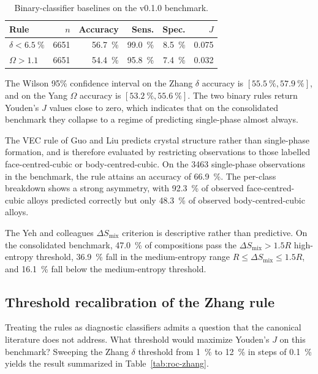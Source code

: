 \documentclass[review,times,nonatbib]{elsarticle}
\newcommand{\Smix}{\ensuremath{\Delta S_{\mathrm{mix}}}}
\newcommand{\Omegaparam}{\ensuremath{\Omega}}
\begin{document}
\begin{table}[ht]
\centering
\caption{Binary-classifier baselines on the v0.1.0 benchmark.}
\label{tab:rule-baselines}
\begin{tabular}{lrrrrr}
\toprule
Rule & $n$ & Accuracy & Sens. & Spec. & $J$ \\
\midrule
$\delta < \SI{6.5}{\percent}$ \cite{zhang2008} & \num{6651} & \SI{56.7}{\percent} & \SI{99.0}{\percent} & \SI{8.5}{\percent} & 0.075 \\
$\Omegaparam > 1.1$ \cite{yang2012}            & \num{6651} & \SI{54.4}{\percent} & \SI{95.8}{\percent} & \SI{7.4}{\percent} & 0.032 \\
\bottomrule
\end{tabular}
\end{table}

The Wilson 95\% confidence interval on the Zhang $\delta$ accuracy
is $[\SI{55.5}{\percent}, \SI{57.9}{\percent}]$, and on the Yang
$\Omegaparam$ accuracy is $[\SI{53.2}{\percent}, \SI{55.6}{\percent}]$.
The two binary rules return Youden's $J$ values close to zero,
which indicates that on the consolidated benchmark they collapse
to a regime of predicting single-phase almost always.

The VEC rule of Guo and Liu \cite{guo2011} predicts crystal
structure rather than single-phase formation, and is therefore
evaluated by restricting observations to those labelled
face-centred-cubic or body-centred-cubic. On the \num{3463}
single-phase observations in the benchmark, the rule attains an
accuracy of \SI{66.9}{\percent}. The per-class breakdown shows a
strong asymmetry, with \SI{92.3}{\percent} of observed
face-centred-cubic alloys predicted correctly but only
\SI{48.3}{\percent} of observed body-centred-cubic alloys.

The Yeh and colleagues \cite{yeh2004} $\Smix$ criterion is
descriptive rather than predictive. On the consolidated benchmark,
\SI{47.0}{\percent} of compositions pass the $\Smix > 1.5 R$
high-entropy threshold, \SI{36.9}{\percent} fall in the
medium-entropy range $R \leq \Smix \leq 1.5R$, and
\SI{16.1}{\percent} fall below the medium-entropy threshold.

\subsection{Threshold recalibration of the Zhang rule}

Treating the rules as diagnostic classifiers admits a question
that the canonical literature does not address. What threshold
would maximize Youden's $J$ on this benchmark? Sweeping the
Zhang \cite{zhang2008} $\delta$ threshold from \SI{1}{\percent} to
\SI{12}{\percent} in steps of \SI{0.1}{\percent} yields the result
summarized in Table~\ref{tab:roc-zhang}.
\end{document}
